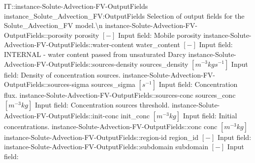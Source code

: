 \begin{SelectionType}
	{IT::instance-Solute-Advection-FV-OutputFields}
	{instance{\_}Solute{\_}Advection{\_}FV:OutputFields}
	{{{Selection of output fields for the Solute{\_}Advection{\_}FV model.{\textbackslash}n}%
}}
		\SelectionItem
			{instance-Solute-Advection-FV-OutputFields::porosity}
			{porosity}
			{{{}{$[-]$}{ Input field: Mobile porosity}%
}}
		\SelectionItem
			{instance-Solute-Advection-FV-OutputFields::water-content}
			{water{\_}content}
			{{{}{$[-]$}{ Input field: INTERNAL - water content passed from unsaturated Darcy}%
}}
		\SelectionItem
			{instance-Solute-Advection-FV-OutputFields::sources-density}
			{sources{\_}density}
			{{{}{$[m^{-3}kgs^{-1}]$}{ Input field: Density of concentration sources.}%
}}
		\SelectionItem
			{instance-Solute-Advection-FV-OutputFields::sources-sigma}
			{sources{\_}sigma}
			{{{}{$[s^{-1}]$}{ Input field: Concentration flux.}%
}}
		\SelectionItem
			{instance-Solute-Advection-FV-OutputFields::sources-conc}
			{sources{\_}conc}
			{{{}{$[m^{-3}kg]$}{ Input field: Concentration sources threshold.}%
}}
		\SelectionItem
			{instance-Solute-Advection-FV-OutputFields::init-conc}
			{init{\_}conc}
			{{{}{$[m^{-3}kg]$}{ Input field: Initial concentrations.}%
}}
		\SelectionItem
			{instance-Solute-Advection-FV-OutputFields::conc}
			{conc}
			{{{}{$[m^{-3}kg]$}{ }%
}}
		\SelectionItem
			{instance-Solute-Advection-FV-OutputFields::region-id}
			{region{\_}id}
			{{{}{$[-]$}{ Input field: }%
}}
		\SelectionItem
			{instance-Solute-Advection-FV-OutputFields::subdomain}
			{subdomain}
			{{{}{$[-]$}{ Input field: }%
}}
\end{SelectionType}
